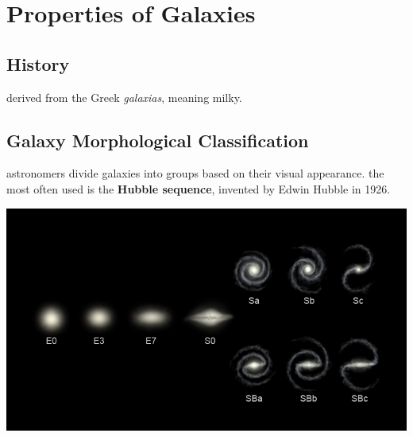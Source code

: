 
\section{Properties of Galaxies}
\subsection{History}
derived from the Greek \emph{galaxias}, meaning milky.
\subsection{Galaxy Morphological Classification}
astronomers divide galaxies into groups based on their visual appearance. the most often used is the \textbf{Hubble sequence}, invented by Edwin Hubble in 1926. 

\begin{center} \includegraphics[scale=0.4]{galaxies/fork} \end{center}

\pagebreak

\pagebreak

\pagebreak

\pagebreak

		
